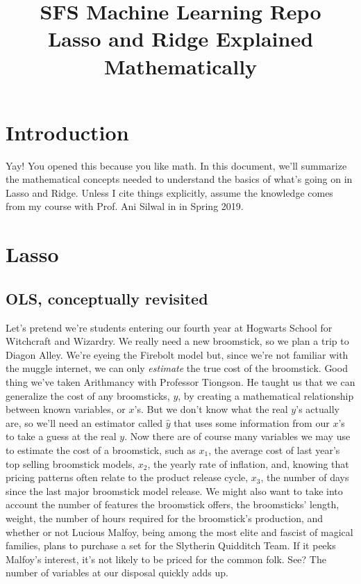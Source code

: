 \documentclass{article}                 %
\title{ SFS Machine Learning Repo \\ Lasso and Ridge Explained Mathematically }
\author{}
\date{}                    							%
\begin{document}
	\maketitle
	\tableofcontents       %

	\newpage

\section{Introduction}
	Yay! You opened this because you like math. In this document, we'll summarize the mathematical concepts needed to understand the basics of what's going on in Lasso and Ridge. Unless I cite things explicitly, assume the knowledge comes from my course with Prof. Ani Silwal in in Spring 2019.

\newpage
\section{Lasso}
\subsection{OLS, conceptually revisited}
	Let's pretend we're students entering our fourth year at Hogwarts School for Witchcraft and Wizardry. We really need a new broomstick, so we plan a trip to Diagon Alley. We're eyeing the Firebolt model but, since we're not familiar with the muggle internet, we can only \textit{estimate} the true cost of the broomstick. Good thing we've taken Arithmancy with Professor Tiongson. He taught us that we can generalize the cost of any broomsticks, $y$, by creating a mathematical relationship between known variables, or $x$'s. But we don't know what the real $y$'s actually are, so we'll need an estimator called $\hat{y}$ that uses some information from our $x$'s to take a guess at the real $y$. Now there are of course many variables we may use to estimate the cost of a broomstick, such as $x_1$, the average cost of last year's top selling broomstick models, $x_2$, the yearly rate of inflation, and, knowing that pricing patterns often relate to the product release cycle, $x_3$, the number of days since the last major broomstick model release. We might also want to take into account the number of features the broomstick offers, the broomsticks' length, weight, the number of hours required for the broomstick's production, and whether or not Lucious Malfoy, being among the most elite and fascist of magical families, plans to purchase a set for the Slytherin Quidditch Team. If it peeks Malfoy's interest, it's not likely to be priced for the common folk. See? The number of variables at our disposal quickly adds up.
\end{document}
